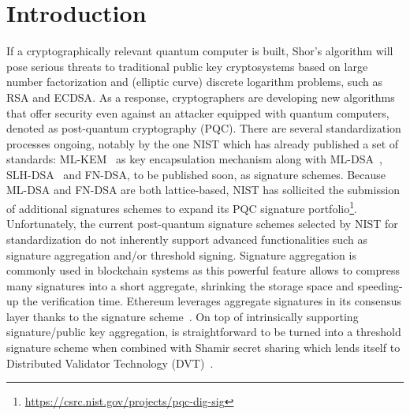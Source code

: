 \section{Introduction}
If a cryptographically relevant quantum computer is built, Shor’s algorithm will pose serious threats to traditional public key cryptosystems based on large number factorization and (elliptic curve) discrete logarithm problems, such as \textsf{RSA} and \textsf{ECDSA}.
As a response, cryptographers are developing new algorithms that offer security even against an attacker equipped with quantum computers, denoted as post-quantum cryptography (PQC).
There are several standardization processes ongoing, notably by the one NIST which has already published a set of standards: ML-KEM~\cite{fips203} as key encapsulation mechanism along with \textsf{ML-DSA}~\cite{fips204}, \textsf{SLH-DSA}~\cite{fips205} and \textsf{FN-DSA}, to be published soon, as signature schemes.
Because \textsf{ML-DSA} and \textsf{FN-DSA} are both lattice-based, NIST has sollicited the submission of additional signatures schemes to expand its PQC signature portfolio\footnote{\url{https://csrc.nist.gov/projects/pqc-dig-sig}}.
Unfortunately, the current post-quantum signature schemes selected by NIST for standardization do not inherently support advanced functionalities such as signature aggregation and/or threshold signing.
Signature aggregation is commonly used in blockchain systems as this powerful feature allows to compress many signatures into a short aggregate, shrinking the storage space and speeding-up the verification time.
Ethereum leverages  aggregate signatures in its consensus layer thanks to the \BLS signature scheme~\cite{bls2001}.
On top of intrinsically supporting signature/public key aggregation, \BLS is straightforward to be turned into a threshold signature scheme when combined with Shamir secret sharing which lends itself to Distributed Validator Technology (DVT)~\cite{DVT}.
